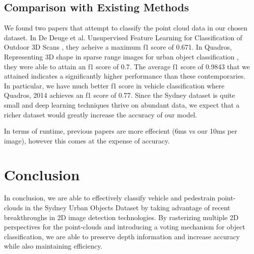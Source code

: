 \documentclass[runningheads,a4paper]{llncs}
\begin{document}
\subsection{Comparison with Existing Methods}
We found two papers that attempt to classify the point cloud data in our chosen dataset.
In De Deuge et al. Unsupervised Feature Learning for Classification of Outdoor 3D Scans
\cite{de2013unsupervised},
they acheive a maximum f1 score of 0.671. In Quadros, Representing 3D shape in sparse 
range images for urban object classification \cite{quadros2013representing}, they were 
able to attain an f1 score of 0.7. The average f1 score of 0.9843 that we attained 
indicates a significantly higher performance than these contemporaries. In particular,
we have much better f1 score in vehicle classification where Quadros, 2014 achieves an f1
score of 0.77. Since the Sydney dataset is quite small and deep learning techniques
thrive on abundant data, we expect that a richer dataset would greatly increase the 
accuracy of our model.

In terms of runtime, previous papers are more effecient (6ms vs our 10ms per image), 
however this comes at the expense of accuracy.


\section{Conclusion}
In conclusion, we are able to effectively classify vehicle and pedestrain point-clouds in the 
Sydney Urban Objects Dataset by taking advantage of recent breakthroughs in 2D image
detection technologies. By rasterizing multiple 2D perspectives for the point-clouds and
introducing a voting mechanism for object classification, we are able to preserve depth 
information and increase accuracy while also maintaining efficiency.



\end{document}

